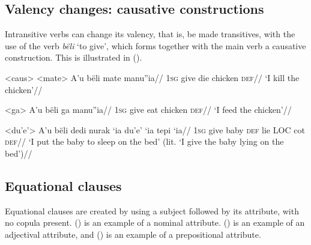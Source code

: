\documentclass[12pt]{article}
\begin{document}
\subsection{Valency changes: causative constructions}

Intransitive verbs can change its valency, that is, be made transitives, with the use of the verb \textit{bëli} `to give', which forms together with the main verb a causative construction. This is illustrated in ().

\pex<caus> %
\a<mate> %
\begingl %
\gla A'u bëli mate manu''ia//
\glb \textsc{1sg} give die chicken \textsc{def}//
\glft `I kill the chicken'//
\endgl

\a<ga> %
\begingl %
\gla A'u bëli ga manu''ia//
\glb \textsc{1sg} give eat chicken \textsc{def}//
\glft `I feed the chicken'// 
\endgl

\a<du'e'> %
\begingl %
\gla A’u bëli {dedi nurak} ‘ia du’e’ ‘ia tepi ‘ia//
\glb \textsc{1sg} give baby \textsc{def} lie \textsc{LOC} cot \textsc{def}//
\glft `I put the baby to sleep on the bed' (lit. `I give the baby lying on the bed')// 
\endgl
\xe

\subsection{Equational clauses}

Equational clauses are created by using a subject followed by its attribute, with no copula present. () is an example of a nominal attribute. () is an example of an adjectival attribute, and () is an example of a prepositional attribute. 


\end{document}
